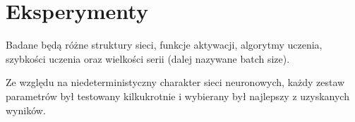 \chapter{Eksperymenty}
Badane będą różne  struktury sieci, funkcje aktywacji, algorytmy uczenia, szybkości uczenia oraz wielkości serii (dalej nazywane batch size).

Ze względu na niedeterministyczny charakter sieci neuronowych, każdy zestaw parametrów był testowany kilkukrotnie i wybierany był najlepszy z uzyskanych wyników.



